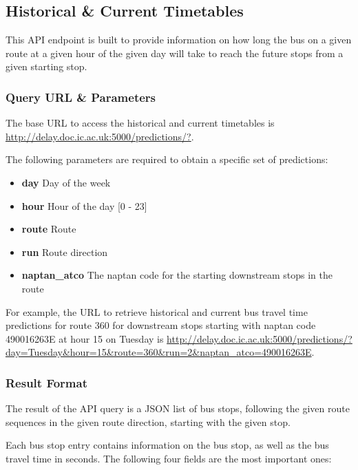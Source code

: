 
\subsection{Historical \& Current Timetables}
\par This API endpoint is built to provide information on how long the bus on a given route at a given hour of the given day will take to reach the future stops from a given starting stop.

\subsubsection{Query URL \& Parameters}
\label{sec:predictions_params}
\par The base URL to access the historical and current timetables is \url{http://delay.doc.ic.ac.uk:5000/predictions/?}.

\par The following parameters are required to obtain a specific set of predictions:
\begin{itemize}
  \item \textbf{day} Day of the week
  \item \textbf{hour} Hour of the day [0 - 23]
  \item \textbf{route} Route
  \item \textbf{run} Route direction
  \item \textbf{naptan\_atco} The \gls{naptan} code for the starting downstream stops in the route
\end{itemize}

\par For example, the URL to retrieve historical and current bus travel time predictions for route 360 for downstream stops starting with \gls{naptan} code 490016263E at hour 15 on Tuesday is \url{http://delay.doc.ic.ac.uk:5000/predictions/?day=Tuesday&hour=15&route=360&run=2&naptan_atco=490016263E}.

\subsubsection{Result Format}
\par The result of the API query is a JSON list of bus stops, following the given route sequences in the given route direction, starting with the given stop.

\par Each bus stop entry contains information on the bus stop, as well as the bus travel time in seconds. The following four fields are the most important ones:

